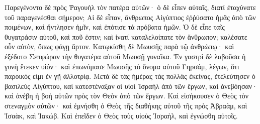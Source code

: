 {Παρεγένοντο δὲ πρὸς Ῥαγουὴλ τὸν πατέρα αὐτῶν· ὁ δὲ εἶπεν αὐταῖς, διατί ἐταχύνατε τοῦ παραγενέσθαι σήμερον;
Αἱ δὲ εἶπαν, ἄνθρωπος Αἰγύπτιος ἐῤῥύσατο ἡμᾶς ἀπὸ τῶν ποιμένων, καὶ ἤντλησεν ἡμῖν, καὶ ἐπότισε τὰ πρόβατα ἡμῶν.
Ὁ δὲ εἶπε ταῖς θυγατράσιν αὐτοῦ, καὶ ποῦ ἐστιν; καὶ ἱνατί καταλελοίπατε τὸν ἄνθρωπον; καλέσατε οὖν αὐτὸν, ὅπως φάγῃ ἄρτον.
Κατῳκίσθη δὲ Μωυσῆς παρὰ τῷ ἀνθρώπῳ· καὶ ἐξέδοτο Σεπφώραν τὴν θυγατέρα αὐτοῦ Μωυσῇ γυναῖκα.
Ἐν γαστρὶ δὲ λαβοῦσα ἡ γυνὴ ἔτεκεν υἱόν· καὶ ἐπωνόμασε Μωυσῆς τὸ ὄνομα αὐτοῦ Γηρσάμ, λέγων, ὅτι παροικός εἰμι ἐν γῇ ἀλλοτρίᾳ.
Μετὰ δὲ τὰς ἡμέρας τὰς πολλὰς ἐκείνας, ἐτελεύτησεν ὁ βασιλεὺς Αἰγύπτου, καὶ κατεστέναξαν οἱ υἱοὶ Ἰσραὴλ ἀπὸ τῶν ἔργων, καὶ ἀνεβόησαν· καὶ ἀνέβη ἡ βοὴ αὐτῶν πρὸς τὸν Θεὸν ἀπὸ τῶν ἔργων.
Καὶ εἰσήκουσεν ὁ Θεὸς τὸν στεναγμὸν αὐτῶν· καὶ ἐμνήσθη ὁ Θεὸς τῆς διαθήκης αὐτοῦ τῆς πρὸς Ἀβραὰμ, καὶ Ἰσαὰκ, καὶ Ἰακώβ.
Καὶ ἐπεῖδεν ὁ Θεὸς τοὺς υἱοὺς Ἰσραὴλ, καὶ ἐγνώσθη αὐτοῖς.

}
